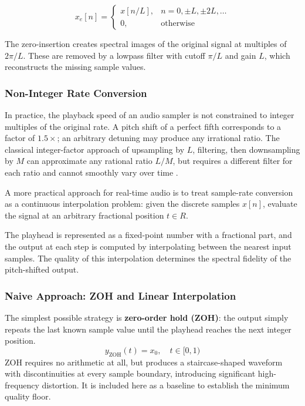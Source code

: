 \begin{equation}
x_e[n] = \begin{cases} x[n/L], & n = 0, \pm L, \pm 2L, \dots \\ 0, & \text{otherwise} \end{cases}
\end{equation}

The zero-insertion creates spectral images of the original signal at multiples of $2\pi/L$. These are removed by a lowpass filter with cutoff $\pi/L$ and gain $L$, which reconstructs the missing sample values. \cite[p.~191]{oppenheimDiscretetimeSignalProcessing2014}

\subsubsection{Non-Integer Rate Conversion}
In practice, the playback speed of an audio sampler is not constrained to integer multiples of the original rate. 
A pitch shift of a perfect fifth corresponds to a factor of $1.5\times$; an arbitrary detuning may produce any irrational ratio. 
The classical integer-factor approach of upsampling by $L$, filtering, then downsampling by $M$ can approximate any rational ratio $L/M$, but requires a different filter for each ratio and cannot smoothly vary over time \cite[p.~197]{oppenheimDiscretetimeSignalProcessing2014}.

A more practical approach for real-time audio is to treat sample-rate conversion as a continuous interpolation problem: given the discrete samples $x[n]$, evaluate the signal at an arbitrary fractional position $t \in R$. 

The playhead is represented as a fixed-point number with a fractional part, and the output at each step is computed by interpolating between the nearest input samples. 
The quality of this interpolation determines the spectral fidelity of the pitch-shifted output.



\subsubsection{Naive Approach: ZOH and Linear Interpolation}

The simplest possible strategy is \textbf{zero-order hold (ZOH)}: the output simply
repeats the last known sample value until the playhead reaches the next integer position.
\begin{equation}
y_{\text{ZOH}}(t) = x_0, \quad t \in [0, 1)
\end{equation}
ZOH requires no arithmetic at all, but produces a staircase-shaped waveform with 
discontinuities at every sample boundary, introducing significant high-frequency 
distortion. It is included here as a baseline to establish the minimum quality floor.

